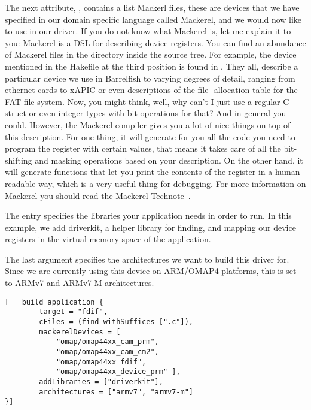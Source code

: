 \documentclass[a4paper,11pt,twoside]{report}
\begin{document}
The next attribute, , contains a list Mackerl files,
these are devices that we have specified in our domain specific language
called Mackerel, and we would now like to use in our driver. If you do not
know what Mackerel is, let me explain it to you: Mackerel is a DSL for
describing device registers. You can find an abundance of Mackerel files in
the  directory inside the source tree. For example, the
 device mentioned in the Hakefile at the third
position is found in . They all,
describe a particular device we use in Barrelfish to varying degrees of
detail, ranging from ethernet cards to xAPIC or even descriptions of the file-
allocation-table for the FAT file-system. Now, you might think, well, why
can't I just use a regular C struct or even integer types with bit operations
for that? And in general you could. However, the Mackerel compiler gives you a
lot of nice things on top of this description. For one thing, it will generate
for you all the code you need to program the register with certain values,
that means it takes care of all the bit-shifting and masking operations based
on your description. On the other hand, it will generate functions that let
you print the contents of the register in a human readable way, which is a
very useful thing for debugging. For more information on Mackerel you should
read the Mackerel Technote~\cite{btn002-mackerel}.

The  entry specifies the libraries your application
needs in order to run. In this example, we add driverkit, a helper library for
finding, and mapping our device registers in the virtual memory space of the
application.

The last argument specifies the architectures we want to build this driver
for. Since we are currently using this device on ARM/OMAP4 platforms, this is
set to ARMv7 and ARMv7-M architectures.

\begin{lstlisting}[caption={A Hakefile for a simple device driver}, label={lst:hakefile}]
[   build application {
        target = "fdif",
        cFiles = (find withSuffices [".c"]),
        mackerelDevices = [
            "omap/omap44xx_cam_prm",
            "omap/omap44xx_cam_cm2",
            "omap/omap44xx_fdif",
            "omap/omap44xx_device_prm" ],
        addLibraries = ["driverkit"],
        architectures = ["armv7", "armv7-m"]
}]
\end{lstlisting}
\end{document}
